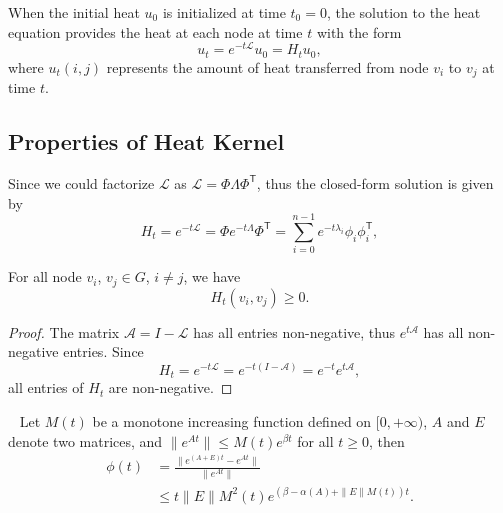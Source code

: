 \documentclass[10pt,journal,compsoc]{IEEEtran}
\begin{document}
When the initial heat $u_{0}$ is initialized at time $t_{0} = 0$, the solution to the heat equation provides the heat at each node at time $t$ with the form
\begin{equation}
     u_{t} = e^{-t \mathcal{L}}u_{0} = H_{t}u_{0},
\end{equation}
where $u_{t}(i, j)$ represents the amount of heat transferred from node $v_{i}$ to $v_{j}$ at time $t$.


\subsection{Properties of Heat Kernel}
Since we could factorize $\mathcal{L}$ as $\mathcal{L} = \Phi \Lambda \Phi^{\mathsf{T}}$, thus the closed-form solution is given by
\begin{equation}
     H_{t} = e^{-t \mathcal{L}} = \Phi e^{-t \Lambda} \Phi^{\mathsf{T}} = \sum \limits_{i = 0}^{n-1}e^{-t\lambda_{i}}\phi_{i}\phi_{i}^{\mathsf{T}},
\end{equation}


\begin{lemma}
  For all node $v_{i}$, $v_{j} \in G$, $i \neq j$, we have
    \begin{equation}
     H_{t}(v_{i}, v_{j}) \geq 0.
    \end{equation}
\end{lemma}


\begin{proof}
  The matrix $\mathcal{A} = I - \mathcal{L}$ has all entries non-negative, thus $e^{t\mathcal{A}}$ has all non-negative entries. Since
\begin{equation}
    H_{t} = e^{-t\mathcal{L}} = e^{-t(I-\mathcal{A})} = e^{-t}e^{t\mathcal{A}},
\end{equation}
all entries of $H_{t}$ are non-negative.
\end{proof}


\begin{lemma}\label{Lemma-3}~\cite{matrix_sensitivity}
Let $M(t)$ be a monotone increasing function defined on $[0, +\infty)$, $A$ and $E$ denote two matrices, and $\|e^{At}\| \leq M(t) e^{\beta t}$ for all $t \geq 0$, then
\begin{equation}
  \begin{aligned}
  \phi(t)   & = \frac{\|e^{(A+E)t} - e^{At}\|}{\|e^{At}\|} \\
            & \leq t \|E\| M^{2}(t) e^{(\beta - \alpha(A) + \|E\| M(t))t}.
  \end{aligned}
\end{equation}
\end{lemma}
\end{document}
